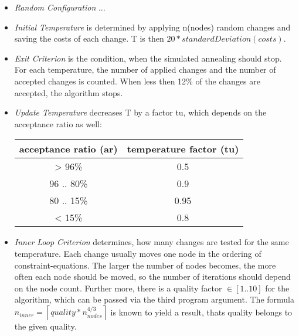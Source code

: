 \documentclass[colorback,accentcolor=tud1c,11pt]{tudreport}
\begin{document}
  \begin{itemize}
  	\item \emph{Random Configuration} ...
  	\item \emph{Initial Temperature} is determined by applying n(nodes) random changes and saving the costs of each change. T is then $20 * standardDeviation(costs)$.
  	\item \emph{Exit Criterion} is the condition, when the simulated annealing should stop. For each temperature, the number of applied changes and the number of accepted changes is counted. When less then 12\% of the changes are accepted, the algorithm stops.
  	\item \emph{Update Temperature} decreases T by a factor tu, which depends on the acceptance ratio as well:
  	\begin{tabular}{ c | c }
  		acceptance ratio (ar) & temperature factor (tu) \\
  		\hline
  		> 96\% & 0.5 \\
  		96 .. 80\% & 0.9 \\
  		80 .. 15\% & 0.95 \\
  		< 15\% & 0.8 \\
  	\end{tabular}
    \item \emph{Inner Loop Criterion} determines, how many changes are tested for the same temperature. Each change usually moves one node in the ordering of constraint-equations. The larger the number of nodes becomes, the more often each node should be moved, so the number of iterations should depend on the node count. Further more, there is a quality factor $\in [1 .. 10]$ for the algorithm, which can be passed via the third program argument. The formula $n_{inner} = \left\lceil quality * n_{nodes}^{4/3} \right\rceil$ is known to yield a result, thats quality belongs to the given quality.
  \end{itemize}
\end{document}
